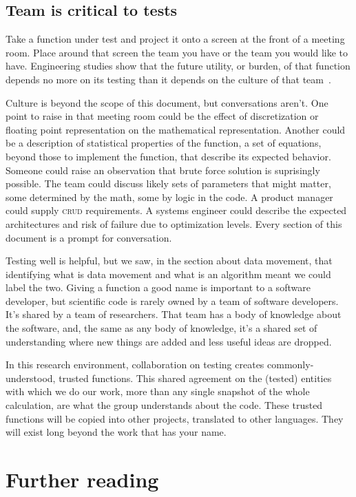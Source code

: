 \documentclass[fleqn,10pt]{olplainarticle}
\begin{document}
\subsection{Team is critical to tests}

Take a function under test and project it onto a
screen at the front of a meeting room. Place around that screen
the team you have or the team you would like to have.
Engineering studies show that the future utility, or burden,
of that function depends no more on its testing than it
depends on the culture of that team~\citep{neumann2016,kanewala2014}.

Culture is beyond the scope of this document, but conversations
aren't. One point to raise in that meeting room could
be the effect of discretization or floating point representation
on the mathematical representation. Another could be a
description of statistical properties of the function, a set
of equations, beyond those to implement the function, that
describe its expected behavior. Someone could raise an observation
that brute force solution is suprisingly possible.
The team could discuss likely sets of parameters that might
matter, some determined by the math, some by logic in the
code. A product manager could supply \textsc{crud} requirements.
A systems engineer could describe the expected architectures
and risk of failure due to optimization levels. Every section
of this document is a prompt for conversation.

Testing well is helpful, but we saw, in the section about
data movement, that identifying what is data movement
and what is an algorithm meant we could label the two.
Giving a function a good name is important to a software
developer, but scientific code is rarely owned by a team
of software developers. It's shared by a team of researchers.
That team has a body of knowledge about the software, and,
the same as any body of knowledge, it's a shared set of
understanding where new things are added and less useful
ideas are dropped.

In this research environment, collaboration on testing
creates commonly-understood, trusted functions. This shared
agreement on the (tested) entities with which we do our work, more
than any single snapshot of the whole calculation, are
what the group understands about the code. These trusted
functions will be copied into other projects, translated
to other languages. They will exist long beyond the work
that has your name.

\section{Further reading}\label{sec:further-reading}
\end{document}
